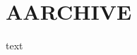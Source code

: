 \documentclass[11pt]{article}
\author{root}
\date{\today}
\title{}
\begin{document}
\tableofcontents

\section{A\hfill{}\textsc{ARCHIVE}}
\label{sec:orgeea3a9f}
text
\end{document}
